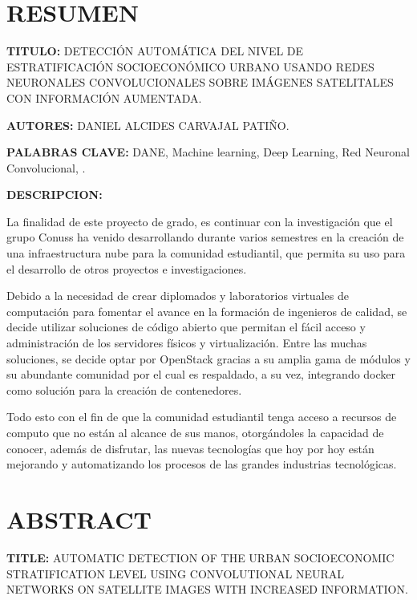 
	\newpage\chapter*{RESUMEN}
    \textbf{TITULO:} DETECCIÓN AUTOMÁTICA DEL NIVEL DE ESTRATIFICACIÓN SOCIOECONÓMICO URBANO USANDO REDES NEURONALES CONVOLUCIONALES SOBRE IMÁGENES SATELITALES CON INFORMACIÓN AUMENTADA.
    
    \textbf{AUTORES:} DANIEL ALCIDES CARVAJAL PATIÑO.
    
    \textbf{PALABRAS CLAVE:} DANE, Machine learning, Deep Learning, Red Neuronal Convolucional, .	
    
    \textbf{DESCRIPCION:} 
    
    La finalidad de este proyecto de grado, es continuar con la investigación  que el grupo Conuss ha venido desarrollando durante varios semestres en la creación de una infraestructura nube para la comunidad estudiantil, que permita su uso para el desarrollo de otros proyectos e investigaciones.
    
    Debido a la necesidad de crear diplomados y laboratorios virtuales de computación para fomentar el avance en la formación de ingenieros de calidad, se decide utilizar soluciones de código abierto que permitan el fácil acceso y administración de los servidores físicos y virtualización. Entre las muchas soluciones, se decide optar por OpenStack gracias a su amplia gama de módulos y su abundante comunidad por el cual es respaldado, a su vez, integrando docker como solución para la creación de contenedores.
    
    Todo esto con el fin de que la comunidad estudiantil tenga acceso a recursos de computo que no están al alcance de sus manos, otorgándoles la capacidad de conocer, además de disfrutar, las nuevas tecnologías que hoy por hoy están mejorando y automatizando los procesos de las grandes industrias tecnológicas.
 
  
	\newpage\chapter*{ABSTRACT}
    \textbf{TITLE:} AUTOMATIC DETECTION OF THE URBAN SOCIOECONOMIC STRATIFICATION LEVEL USING CONVOLUTIONAL NEURAL NETWORKS ON SATELLITE IMAGES WITH INCREASED INFORMATION.
    
